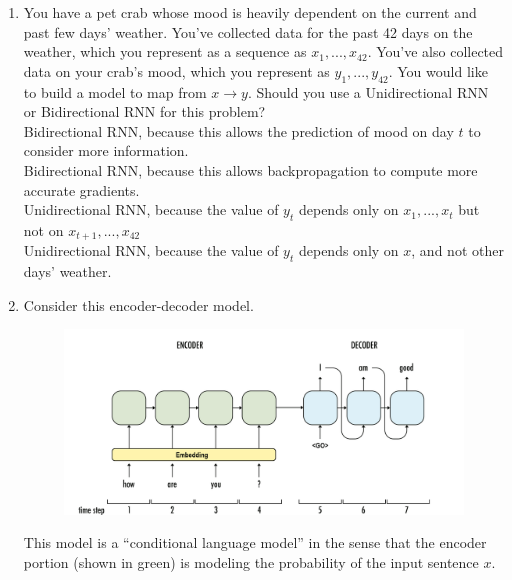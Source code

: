\begin{enumerate}
    
    \item  You have a pet crab whose mood is heavily dependent on the current and past few days' weather. 
        You've collected data for the past 42 days on the weather, which you represent as a sequence as $x_1, ..., x_{42}$. 
        You've also collected data on your crab's mood, which you represent as $y_1, ..., y_{42}$. You would like to build a model to map from $x \rightarrow y$. Should you use a Unidirectional RNN or Bidirectional RNN for this problem? \\ 
        \hspace{1cm}\choice{} Bidirectional RNN, because this allows the prediction of mood on day $t$ to consider more information. \\ 
        \hspace{1cm}\choice{} Bidirectional RNN, because this allows backpropagation to compute more accurate gradients. \\ 
        \hspace{1cm}\checkmark Unidirectional RNN, because the value of $y_t$ depends only on $x_1, ...,x_t$ but not on $x_{t+1},...,x_{42}$ \\ 
        \hspace{1cm}\choice{} Unidirectional RNN, because the value of $y_t$ depends only on $x$, and not other days' weather. \\ 
        \solution{}
    \item Consider this encoder-decoder model. 
        \begin{figure}[h]
            \centering
            \includegraphics[scale=0.30]{figures/enc-dec.png}
        \end{figure}
        This model is a ``conditional language model'' in the sense that the encoder portion (shown in green) is modeling the probability of the input sentence $x$.\\

\end{enumerate}
